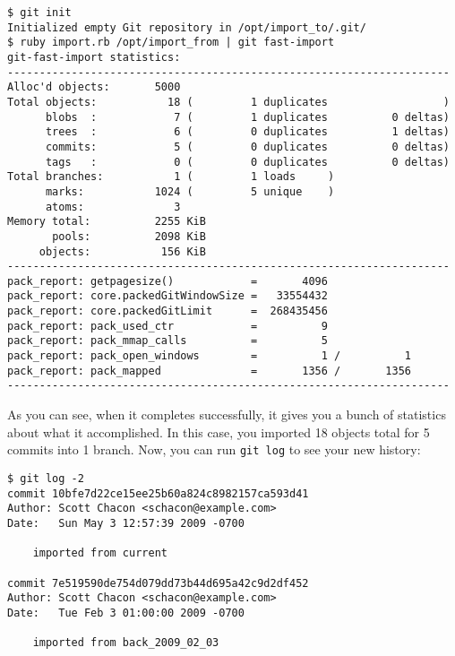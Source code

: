 \documentclass[a4paper]{book}
\begin{document}
\begin{shaded}\begin{verbatim}
$ git init
Initialized empty Git repository in /opt/import_to/.git/
$ ruby import.rb /opt/import_from | git fast-import
git-fast-import statistics:
---------------------------------------------------------------------
Alloc'd objects:       5000
Total objects:           18 (         1 duplicates                  )
      blobs  :            7 (         1 duplicates          0 deltas)
      trees  :            6 (         0 duplicates          1 deltas)
      commits:            5 (         0 duplicates          0 deltas)
      tags   :            0 (         0 duplicates          0 deltas)
Total branches:           1 (         1 loads     )
      marks:           1024 (         5 unique    )
      atoms:              3
Memory total:          2255 KiB
       pools:          2098 KiB
     objects:           156 KiB
---------------------------------------------------------------------
pack_report: getpagesize()            =       4096
pack_report: core.packedGitWindowSize =   33554432
pack_report: core.packedGitLimit      =  268435456
pack_report: pack_used_ctr            =          9
pack_report: pack_mmap_calls          =          5
pack_report: pack_open_windows        =          1 /          1
pack_report: pack_mapped              =       1356 /       1356
---------------------------------------------------------------------
\end{verbatim}\end{shaded}

As you can see, when it completes successfully, it gives you a bunch of statistics about what it accomplished. In this case, you imported 18 objects total for 5 commits into 1 branch. Now, you can run \texttt{git log} to see your new history:

\begin{shaded}\begin{verbatim}
$ git log -2
commit 10bfe7d22ce15ee25b60a824c8982157ca593d41
Author: Scott Chacon <schacon@example.com>
Date:   Sun May 3 12:57:39 2009 -0700

    imported from current

commit 7e519590de754d079dd73b44d695a42c9d2df452
Author: Scott Chacon <schacon@example.com>
Date:   Tue Feb 3 01:00:00 2009 -0700

    imported from back_2009_02_03
\end{verbatim}\end{shaded}
\end{document}
